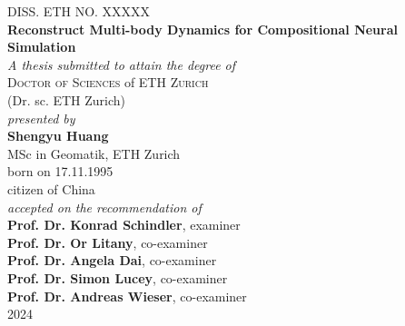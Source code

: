 
\begin{center}
	\large{DISS. ETH NO. XXXXX}\\
\vspace{2 cm}
	\Large{\textbf{Reconstruct Multi-body Dynamics for Compositional Neural Simulation}}\\
\vspace{2 cm}
	\large{\emph{A thesis submitted to attain the degree of}}\\
\vspace{0.5cm}
	\large{\textsc{Doctor of Sciences} of \textsc{ETH Zurich}}\\
\vspace{0.5cm}
	\large{(Dr. sc. ETH Zurich)}\\
\vspace{2cm}
	\large{\emph{presented by}}\\
\vspace{0.5cm}
	\large{\textbf{Shengyu Huang}}\\
\vspace{0.3cm}
	\large{MSc in Geomatik, ETH Zurich}\\
\vspace{0.3cm}
	\large{born on 17.11.1995}\\
\vspace{0.3cm}
	\large{citizen of China}\\
\vspace{2cm}
	\large{\emph{accepted on the recommendation of}}\\
\vspace{0.5cm}
	\large{\textbf{Prof. Dr. Konrad Schindler}, examiner %
}\\
\vspace{0.1cm}
	\large{\textbf{Prof. Dr. Or Litany}, co-examiner %
}\\
\vspace{0.1cm}
	\large{\textbf{Prof. Dr. Angela Dai}, co-examiner %
}\\
\vspace{0.1cm}
	\large{\textbf{Prof. Dr. Simon Lucey}, co-examiner %
}\\
\vspace{0.1cm}
	\large{\textbf{Prof. Dr. Andreas Wieser}, co-examiner %
}\\

\vspace{2cm}
	\large{2024}
\end{center}


